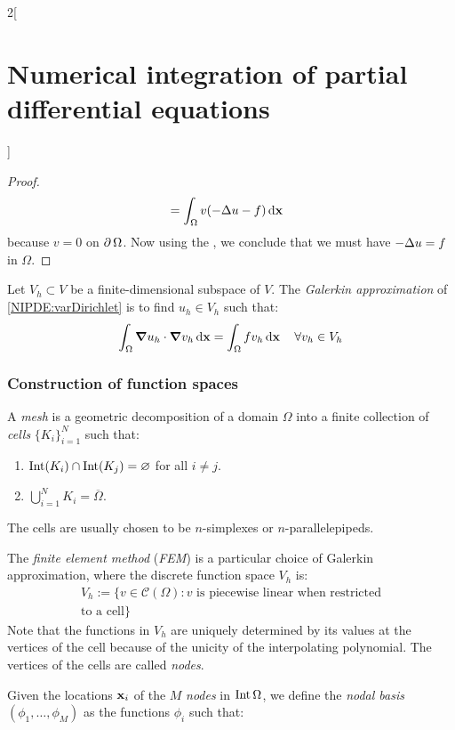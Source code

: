 \documentclass[../../../main_math.tex]{subfiles}
\begin{document}
\begin{multicols}{2}[\section{Numerical integration of partial differential equations}]
\begin{proof}
\begin{align*}
        & =\int_\Omega v(-\Delta u-f)\dd{\boldsymbol{\mathrm{x}}}
    \end{align*}
    because $v=0$ on $\operatorname{\partial}{\Omega}$. Now using the , we conclude that we must have $-\Delta u=f$ in $\Omega$.
  \end{proof}
  \begin{definition}
    Let $V_h\subset V$ be a finite-dimensional subspace of $V$. The \emph{Galerkin approximation} of \cref{NIPDE:varDirichlet} is to find $u_h\in V_h$ such that:
    \begin{equation}\label{NIPDE:Galerkin}
      \int_\Omega \grad{u_h}\cdot\grad{v_h}\dd{\boldsymbol{\mathrm{x}}}=\int_\Omega fv_h\dd{\boldsymbol{\mathrm{x}}}\quad\forall v_h\in V_h
    \end{equation}
  \end{definition}
  \subsubsection{Construction of function spaces}
  \begin{definition}[Mesh]
    A \emph{mesh} is a geometric decomposition of a domain $\Omega$ into a finite collection of \emph{cells} ${\{K_i\}}_{i=1}^N$ such that:
    \begin{enumerate}
      \item $\operatorname{Int}(K_i) \cap \operatorname{Int}(K_j) = \varnothing$ for all $i\neq j$.
      \item $\bigcup_{i=1}^N K_i = \overline{\Omega}$.
    \end{enumerate}
    The cells are usually chosen to be $n$-simplexes or $n$-parallelepipeds.
  \end{definition}
  \begin{definition}
    The \emph{finite element method} (\emph{FEM}) is a particular choice of Galerkin approximation, where the discrete function space
    $V_h$ is:
    \begin{multline*}
      V_h:=\{v\in\mathcal{C}(\Omega):v\text{ is piecewise linear when restricted}\\\text{to a cell}\}
    \end{multline*}
    Note that the functions in $V_h$ are uniquely determined by its values at the vertices of the cell because of the unicity of the interpolating polynomial. The vertices of the cells are called \emph{nodes}.
  \end{definition}
  \begin{definition}
    Given the locations $\boldsymbol{\mathrm{x}}_i$ of the $M$ \emph{nodes} in $\operatorname{Int}\Omega$, we define the \emph{nodal basis} $(\phi_1,\ldots,\phi_M)$ as the functions $\phi_i$ such that:

\end{definition}
\end{multicols}
\end{document}
